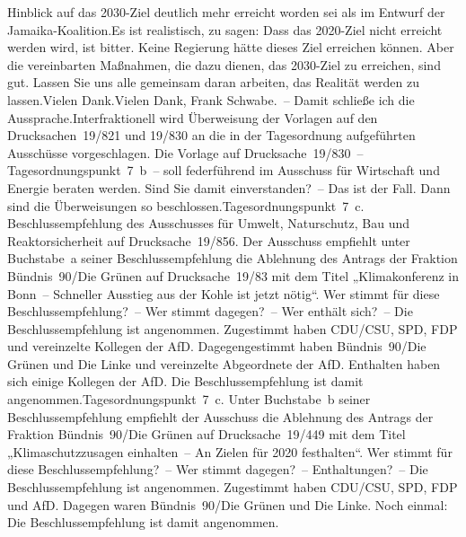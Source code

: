 \documentclass{article}
\begin{document}
Hinblick auf das 2030-Ziel deutlich mehr erreicht worden sei als im Entwurf der Jamaika-Koalition.Es ist realistisch, zu sagen: Dass das 2020-Ziel nicht erreicht werden wird, ist bitter. Keine Regierung hätte dieses Ziel erreichen können. Aber die vereinbarten Maßnahmen, die dazu dienen, das 2030-Ziel zu erreichen, sind gut. Lassen Sie uns alle gemeinsam daran arbeiten, das Realität werden zu lassen.Vielen Dank.Vielen Dank, Frank Schwabe. – Damit schließe ich die Aussprache.Interfraktionell wird Überweisung der Vorlagen auf den Drucksachen 19/821 und 19/830 an die in der Tagesordnung aufgeführten Ausschüsse vorgeschlagen. Die Vorlage auf Drucksache 19/830 – Tagesordnungspunkt 7 b – soll federführend im Ausschuss für Wirtschaft und Energie beraten werden. Sind Sie damit einverstanden? – Das ist der Fall. Dann sind die Überweisungen so beschlossen.Tagesordnungspunkt 7 c. Beschlussempfehlung des Ausschusses für Umwelt, Naturschutz, Bau und Reaktorsicherheit auf Drucksache 19/856. Der Ausschuss empfiehlt unter Buchstabe a seiner Beschlussempfehlung die Ablehnung des Antrags der Fraktion Bündnis 90/Die Grünen auf Drucksache 19/83 mit dem Titel „Klimakonferenz in Bonn – Schneller Ausstieg aus der Kohle ist jetzt nötig“. Wer stimmt für diese Beschlussempfehlung? – Wer stimmt dagegen? – Wer enthält sich? – Die Beschlussempfehlung ist angenommen. Zugestimmt haben CDU/CSU, SPD, FDP und vereinzelte Kollegen der AfD. Dagegengestimmt haben Bündnis 90/Die Grünen und Die Linke und vereinzelte Abgeordnete der AfD. Enthalten haben sich einige Kollegen der AfD. Die Beschlussempfehlung ist damit angenommen.Tagesordnungspunkt 7 c. Unter Buchstabe b seiner Beschlussempfehlung empfiehlt der Ausschuss die Ablehnung des Antrags der Fraktion Bündnis 90/Die Grünen auf Drucksache 19/449 mit dem Titel „Klimaschutzzusagen einhalten – An Zielen für 2020 festhalten“. Wer stimmt für diese Beschlussempfehlung? – Wer stimmt dagegen? – Enthaltungen? – Die Beschlussempfehlung ist angenommen. Zugestimmt haben CDU/CSU, SPD, FDP und AfD. Dagegen waren Bündnis 90/Die Grünen und Die Linke. Noch einmal: Die Beschlussempfehlung ist damit angenommen.
\end{document}
